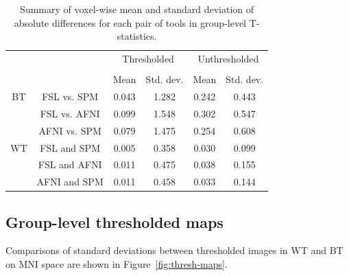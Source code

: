 \documentclass[conference]{IEEEtran}
\begin{document}
\setlength{\tabcolsep}{7pt}
\begin{table}[h]
    \centering
    \begin{tabular}{cccc|cc}
        \toprule
        \multirow{2}{*}{}& {} & \multicolumn{2}{c}{Thresholded} & \multicolumn{2}{c}{Unthresholded} \\
        \cmidrule{3-4} \cmidrule{5-6} \\
        {} & {} & Mean & Std. dev. & Mean & Std. dev. \\
        \midrule
        \rowcolor{lightgray}
        {BT} & FSL vs. SPM          &  0.043       & 1.282      & 0.242     & 0.443  \\
        \rowcolor{lightgray}
        {} & FSL vs. AFNI         &  0.099       & 1.548      & 0.302     & 0.547  \\
        \rowcolor{lightgray}
        {} & AFNI vs. SPM         &  0.079       & 1.475      & 0.254     & 0.608  \\
        {WT} & FSL and SPM    &  0.005       & 0.358      & 0.030     & 0.099  \\
        {} & FSL and AFNI   &  0.011       & 0.475      & 0.038     & 0.155  \\
        {} & AFNI and SPM   &  0.011       & 0.458      & 0.033     & 0.144  \\
        \bottomrule
    \end{tabular}
    \caption{Summary of voxel-wise mean and standard deviation of absolute differences for each pair of tools
    in group-level T-statistics.}
    \label{table:pipeline-stats}
\end{table}


\subsection{Group-level thresholded maps}

Comparisons of standard deviations between thresholded images in WT and BT
on MNI space are shown in Figure~\ref{fig:thresh-maps}.
\end{document}
